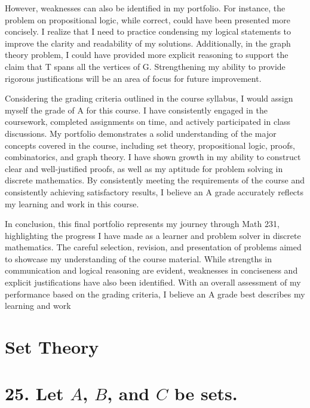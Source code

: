 \documentclass{article}
\begin{document}
However, weaknesses can also be identified in my portfolio. For instance, the problem on propositional logic, while correct, could have been presented more concisely. I realize that I need to practice condensing my logical statements to improve the clarity and readability of my solutions. Additionally, in the graph theory problem, I could have provided more explicit reasoning to support the claim that T spans all the vertices of G. Strengthening my ability to provide rigorous justifications will be an area of focus for future improvement.

Considering the grading criteria outlined in the course syllabus, I would assign myself the grade of A for this course. I have consistently engaged in the coursework, completed assignments on time, and actively participated in class discussions. My portfolio demonstrates a solid understanding of the major concepts covered in the course, including set theory, propositional logic, proofs, combinatorics, and graph theory. I have shown growth in my ability to construct clear and well-justified proofs, as well as my aptitude for problem solving in discrete mathematics. By consistently meeting the requirements of the course and consistently achieving satisfactory results, I believe an A grade accurately reflects my learning and work in this course.

In conclusion, this final portfolio represents my journey through Math 231, highlighting the progress I have made as a learner and problem solver in discrete mathematics. The careful selection, revision, and presentation of problems aimed to showcase my understanding of the course material. While strengths in communication and logical reasoning are evident, weaknesses in conciseness and explicit justifications have also been identified. With an overall assessment of my performance based on the grading criteria, I believe an A grade best describes my learning and work
\newpage
\section*{Set Theory}
\section*{25. Let $A$, $B$, and $C$ be sets.}
\end{document}
